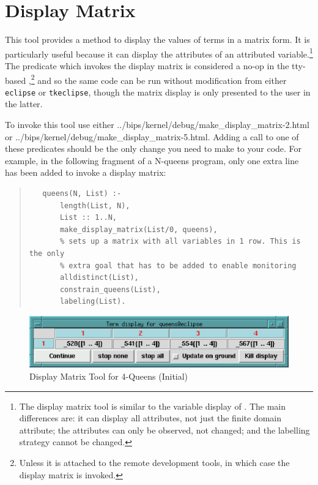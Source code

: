 \section{Display Matrix}
\label{displaymat}

This tool provides a method to display the values of terms in a matrix
form. It is particularly useful because it can display the attributes of an
attributed variable.\footnote{%
  The display matrix tool is similar to the variable display of
  .
  The main differences are:
  it can display all attributes, not just the finite domain attribute;
  the attributes can only be observed, not changed;
  and the labelling strategy cannot be changed.}
The predicate which invokes the display matrix is considered a no-op
in the tty-based {\eclipse},\footnote{%
  Unless it is attached to the remote
  development tools, in which case the display matrix is invoked.}
and so the same code can be run without
modification from either \texttt{eclipse} or \texttt{tkeclipse}, though
the matrix display is only presented to the user in the latter.

To invoke this tool use either
%
{../bips/kernel/debug/make_display_matrix-2.html}
or
%
{../bips/kernel/debug/make_display_matrix-5.html}.
Adding a call to one of these predicates should be the only change you need
to make to your code.
For example, in the following fragment of a N-queens program, only one
extra line has been added to invoke a display matrix:
\vfill      %
\pagebreak  %
\begin{quote}
\begin{verbatim}
   queens(N, List) :-
       length(List, N),
       List :: 1..N,
       make_display_matrix(List/0, queens),
       % sets up a matrix with all variables in 1 row. This is the only
       % extra goal that has to be added to enable monitoring
       alldistinct(List),
       constrain_queens(List),
       labeling(List).
\end{verbatim}
\end{quote}

\begin{figure}[bt]
\begin{center}
\includegraphics{dismat.eps}
\end{center}
\caption{Display Matrix Tool for 4-Queens (Initial)}
\label{dismat}
\end{figure}

